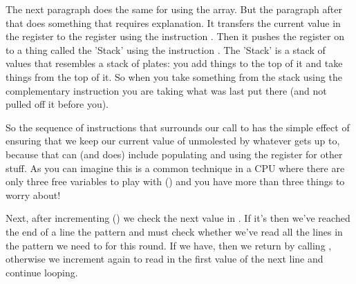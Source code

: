 The next paragraph does the same for  using the  array. But the paragraph after
that does something that requires explanation. It transfers the current value in the  register to the  register
using the instruction . Then it pushes the  register on to a thing called the 'Stack' using the instruction
. The 'Stack' is a stack of values that resembles a stack of plates: you add things to the top of it and take things
from the top of it. So when you take something from the stack using the complementary instruction  you are taking
what was last put there (and not pulled off it before you).

So the  sequence of instructions that surrounds our call to  has the
simple effect of ensuring that we keep our current value of  unmolested by whatever 
gets up to, because that can (and does) include populating and using the  register for other stuff. As you can imagine
this is a common technique in a CPU where there are only three free variables to play with () and you have more than three things
to worry about!

Next, after incrementing  () we check the next value in . If it's  then
we've reached the end of a line the pattern and must check whether we've read all the lines in the pattern we need to for this
round. If we have, then we return by calling , otherwise we increment  again to read
in the first value of the next line and continue looping.

